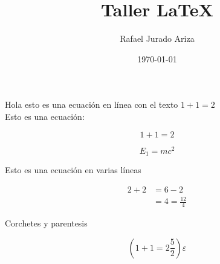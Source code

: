 \documentclass[a4paper]{article}
\title{\vspace{-1.5cm}Taller \LaTeX}
\author{Rafael Jurado Ariza}
\date{\today}
\begin{document}
    Hola esto es una ecuación en línea con el texto $1+1=2$\\ %
    Esto es una ecuación:

    \begin{equation} %
        1+1=2
    \end{equation}

    \begin{equation*}
        E_1=mc^2 %
    \end{equation*}%

    Esto es una ecuación en varias líneas

    \begin{align*}
        2+2&=6-2\\
        &=4=\frac{12}{4} %
    \end{align*}

    Corchetes  y parentesis 

    \begin{equation*}  
        \left(1+1=2 \frac{5}{2}\right)
        \varepsilon %
    \end{equation*}

    \newpage %
\end{document}
